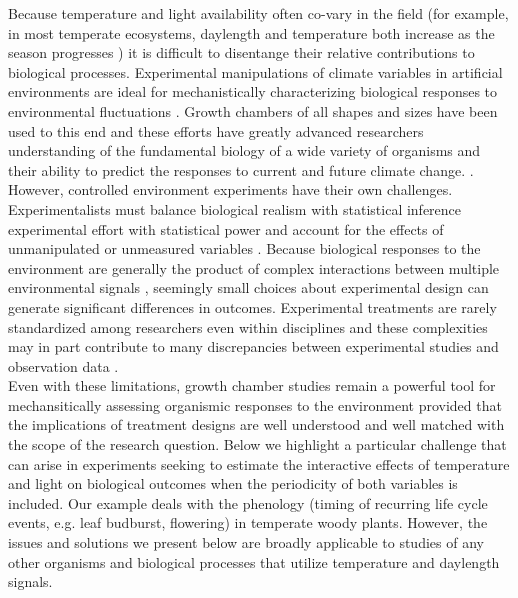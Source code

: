 \documentclass[11pt]{article}
\begin{document}
\noindent Because temperature and light availability often co-vary in the field (for example, in most temperate ecosystems, daylength and temperature both increase as the season progresses \citep{}) it is difficult to disentange their relative contributions to biological processes. Experimental manipulations of climate variables in artificial environments are ideal for mechanistically characterizing biological responses to environmental fluctuations \citep{Ettinger:2020aa,Primack2015}. Growth chambers of all shapes and sizes have been used to this end \citep{} and these efforts have greatly advanced researchers understanding of the fundamental biology of a wide variety of organisms and their ability to predict the responses to current and future climate change. \citep{}.\\ 

However, controlled environment experiments have their own challenges. Experimentalists must balance biological realism with statistical inference experimental effort with statistical power  and account for the effects of unmanipulated or unmeasured variables \citep{}. Because biological responses to the environment are generally the product of complex interactions between multiple environmental signals \citep{Casal:2002vz}, seemingly small choices about experimental design can generate significant differences in outcomes. Experimental treatments are rarely standardized among researchers even within disciplines \citep{limiting cues} and these complexities may in part contribute to many discrepancies between experimental studies and observation data \citep{Poorter:2016aa}.\\

\noindent Even with these limitations, growth chamber studies remain a powerful tool for mechansitically assessing organismic responses to the environment provided that the implications of  treatment designs are well understood and well matched with the scope of the research question. Below we highlight a particular challenge that can arise in experiments seeking to estimate the interactive effects of temperature and light on biological outcomes when the periodicity of both variables is included. Our example deals with the phenology (timing of recurring life cycle events, e.g. leaf budburst, flowering) in temperate woody plants. However, the issues and solutions we present below are broadly applicable to studies of any other organisms and biological processes that utilize temperature and daylength signals. \\
\end{document}
